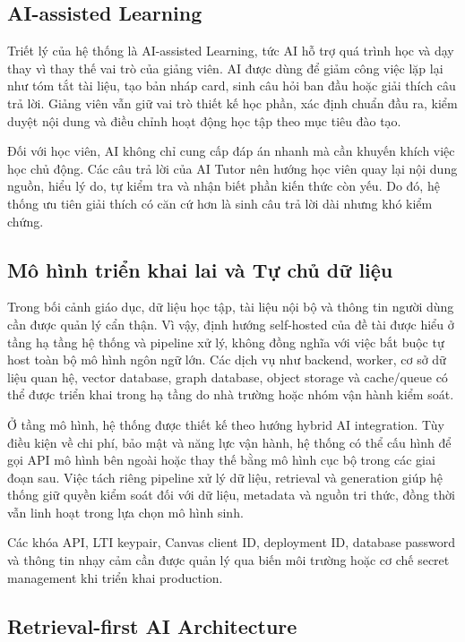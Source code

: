 \subsection{AI-assisted Learning}

Triết lý của hệ thống là AI-assisted Learning, tức AI hỗ trợ quá trình học và
dạy thay vì thay thế vai trò của giảng viên. AI được dùng để giảm công việc
lặp lại như tóm tắt tài liệu, tạo bản nháp card, sinh câu hỏi ban đầu hoặc
giải thích câu trả lời. Giảng viên vẫn giữ vai trò thiết kế học phần, xác định
chuẩn đầu ra, kiểm duyệt nội dung và điều chỉnh hoạt động học tập theo mục
tiêu đào tạo.

Đối với học viên, AI không chỉ cung cấp đáp án nhanh mà cần khuyến khích việc
học chủ động. Các câu trả lời của AI Tutor nên hướng học viên quay lại nội
dung nguồn, hiểu lý do, tự kiểm tra và nhận biết phần kiến thức còn yếu. Do
đó, hệ thống ưu tiên giải thích có căn cứ hơn là sinh câu trả lời dài nhưng
khó kiểm chứng.

\subsection{Mô hình triển khai lai và Tự chủ dữ liệu}

Trong bối cảnh giáo dục, dữ liệu học tập, tài liệu nội bộ và thông tin người
dùng cần được quản lý cẩn thận. Vì vậy, định hướng self-hosted của đề tài được
hiểu ở tầng hạ tầng hệ thống và pipeline xử lý, không đồng nghĩa với việc bắt
buộc tự host toàn bộ mô hình ngôn ngữ lớn. Các dịch vụ như backend, worker, cơ
sở dữ liệu quan hệ, vector database, graph database, object storage và
cache/queue có thể được triển khai trong hạ tầng do nhà trường hoặc nhóm vận
hành kiểm soát.

Ở tầng mô hình, hệ thống được thiết kế theo hướng hybrid AI integration. Tùy
điều kiện về chi phí, bảo mật và năng lực vận hành, hệ thống có thể cấu hình
để gọi API mô hình bên ngoài hoặc thay thế bằng mô hình cục bộ trong các giai
đoạn sau. Việc tách riêng pipeline xử lý dữ liệu, retrieval và generation giúp
hệ thống giữ quyền kiểm soát đối với dữ liệu, metadata và nguồn tri thức, đồng
thời vẫn linh hoạt trong lựa chọn mô hình sinh.

Các khóa API, LTI keypair, Canvas client ID, deployment ID, database password
và thông tin nhạy cảm cần được quản lý qua biến môi trường hoặc cơ chế secret
management khi triển khai production.

\subsection{Retrieval-first AI Architecture}

